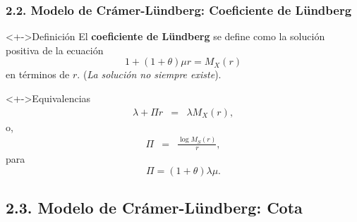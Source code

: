 \documentclass[cjk,t,compress]{beamer}
\renewcommand{\log}{\operatorname{\text{log}}}
\begin{document}
\begin{frame}[fragile]
\frametitle{2.2. Modelo de Cr\'amer-L\"undberg: Coeficiente de L\"undberg}
\scriptsize  	

\vspace{0.1cm}
\begin{block}<+->{Definici\'on}
	\vspace{0.1cm}
	El {\bf coeficiente de L\"undberg} se define como la soluci\'on positiva de la ecuaci\'on
	\begin{equation}
		1+(1+\theta)\mu r = M_X(r)
	\end{equation}
	en t\'erminos de $r$. ({\it La soluci\'on no siempre existe}).
\end{block}

\vspace{0.1cm}
\begin{block}<+->{Equivalencias}
	\begin{eqnarray}
		\lambda + \Pi r 
		  & = & \lambda M_X(r),
		\nonumber
	\end{eqnarray}
	o,
	\begin{eqnarray}
	\Pi 
		& = &
		\frac{\log M_S(r)}{r},
		\nonumber
	\end{eqnarray}
	para 
	$$
	\Pi = (1+\theta)\lambda\mu.
	$$
\end{block}

\end{frame}

%
%
\subsection{2.3. Modelo de Cr\'amer-L\"undberg: Cota}
\end{document}

